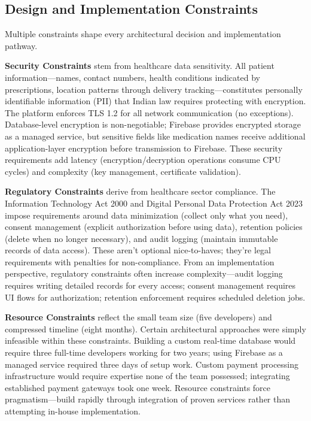 \documentclass[12pt,a4paper]{report}
\begin{document}
\subsection{Design and Implementation Constraints}

Multiple constraints shape every architectural decision and implementation pathway.

\textbf{Security Constraints} stem from healthcare data sensitivity. All patient information—names, contact numbers, health conditions indicated by prescriptions, location patterns through delivery tracking—constitutes personally identifiable information (PII) that Indian law requires protecting with encryption. The platform enforces TLS 1.2 for all network communication (no exceptions). Database-level encryption is non-negotiable; Firebase provides encrypted storage as a managed service, but sensitive fields like medication names receive additional application-layer encryption before transmission to Firebase. These security requirements add latency (encryption/decryption operations consume CPU cycles) and complexity (key management, certificate validation).

\textbf{Regulatory Constraints} derive from healthcare sector compliance. The Information Technology Act 2000 and Digital Personal Data Protection Act 2023 impose requirements around data minimization (collect only what you need), consent management (explicit authorization before using data), retention policies (delete when no longer necessary), and audit logging (maintain immutable records of data access). These aren't optional nice-to-haves; they're legal requirements with penalties for non-compliance. From an implementation perspective, regulatory constraints often increase complexity—audit logging requires writing detailed records for every access; consent management requires UI flows for authorization; retention enforcement requires scheduled deletion jobs.

\textbf{Resource Constraints} reflect the small team size (five developers) and compressed timeline (eight months). Certain architectural approaches were simply infeasible within these constraints. Building a custom real-time database would require three full-time developers working for two years; using Firebase as a managed service required three days of setup work. Custom payment processing infrastructure would require expertise none of the team possessed; integrating established payment gateways took one week. Resource constraints force pragmatism—build rapidly through integration of proven services rather than attempting in-house implementation.
\end{document}
